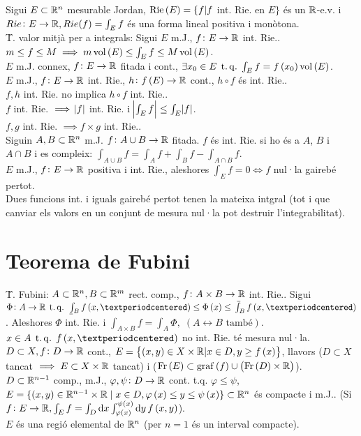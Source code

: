 \ci Sigui $E\subset\mathbb{R}^n$ mesurable Jordan, $\operatorname{Rie}\left( E \right) = \{f | f$ int. Rie. en $E \}$ és un $\mathbb{R}$-e.v. i $Rie\colon E \to \mathbb{R}, Rie(f) = \int_E f$ és una forma lineal positiva i monòtona. \\
\u{T. valor mitjà per a integrals}: Sigui $E$ m.J., $f\colon E\to\mathbb{R}$ int. Rie.. $m\leq f\leq M \implies m\operatorname{vol}\left( E \right)\leq \int_E f\leq M\operatorname{vol}\left( E \right)$. \\
\ci $E$ m.J. connex, $f\colon E\to\mathbb{R}$ fitada i cont., $\exists x_0 \in E \operatorname{\;t.q.\;} \int_E f = f\left( x_0 \right)\operatorname{vol}\left( E \right)$. \\
\ci $E$ m.J., $f\colon E\to \mathbb{R}$ int. Rie., $h \colon f\left( E \right) \to \mathbb{R}$ cont., $h\circ f$ és int. Rie.. \\
\ci $f, h$ int. Rie. no implica $h\circ f$ int. Rie.. \\
\ci $f$ int. Rie. $\implies \abs{f}$ int. Rie. i $\abs{\int_E f} \leq \int_E \abs{f}$. \\
\ci $f, g$ int. Rie. $\implies f\times g$ int. Rie.. \\
\ci Siguin $A,B\subset\mathbb{R}^n$ m.J. $f\colon A\cup B\to \mathbb{R}$ fitada. $f$ és int. Rie. si ho és a $A$, $B$ i $A\cap B$  i es compleix: $\int_{A\cup B} f= \int_A f + \int_B f - \int_{A\cap B} f$. \\
\ci $E$ m.J., $f\colon E \to \mathbb{R}$ positiva i int. Rie., aleshores $\int_E f=0 \iff f$ nul·la gairebé pertot. \\
\ci Dues funcions int. i iguals gairebé pertot tenen la mateixa intgral (tot i que canviar els valors en un conjunt de mesura nul·la pot destruir l'integrabilitat).

\section{Teorema de Fubini}

\u{T. Fubini}: $A\subset\mathbb{R}^n, B \subset \mathbb{R}^m$ rect. comp., $f\colon A\times B \to \mathbb{R}$ int. Rie.. Sigui $\Phi\colon A\to\real \tq \lowint_B f\left( x,· \right) \leq \Phi\left( x \right) \leq \upint_B f\left( x, · \right)$. Aleshores $\Phi$ int. Rie. i $\int_{A\times B} f = \int_A \Phi,\; \left( A \leftrightarrow B \text{ també}\right)$. \\
\ci $x \in A \tq f\left( x, · \right)$ no int. Rie. té mesura nul·la. \\
\ci $D\subset X, f\colon D\to \mathbb{R}$ cont., $E = \left\{ \left( x, y  \right)\in X\times \mathbb{R} | x\in D, y \geq f\left( x \right) \right\}$, llavors ($D\subset X$ tancat $\implies E\subset X\times\mathbb{R}$ tancat) i ($\operatorname{Fr}\left( E \right) \subset \operatorname{graf}\left( f \right) \cup \left( \operatorname{Fr}\left( D \right)\times \mathbb{R}  \right)$). \\
\ci $D\subset \mathbb{R}^{n-1}$ comp., m.J., $\varphi, \psi\colon D\to \mathbb{R}$ cont. t.q. $\varphi \leq \psi$, $E = \{ \left( x,y \right)\in\mathbb{R}^{n-1}\times \mathbb{R}\;|\; x\in D, \varphi\left( x \right) \leq y \leq \psi\left( x \right) \} \subset \mathbb{R}^n$ és compacte i m.J.. (Si $f\colon E\to \real, \int_E f = \int_D \dif x\int_{\varphi\left( x \right)}^{\psi\left( x \right)}\dif y\, f\left( x, y \right)$). \\
\ci $E$ és una regió elemental de $\mathbb{R}^n$ (per $n=1$ és un interval compacte).

